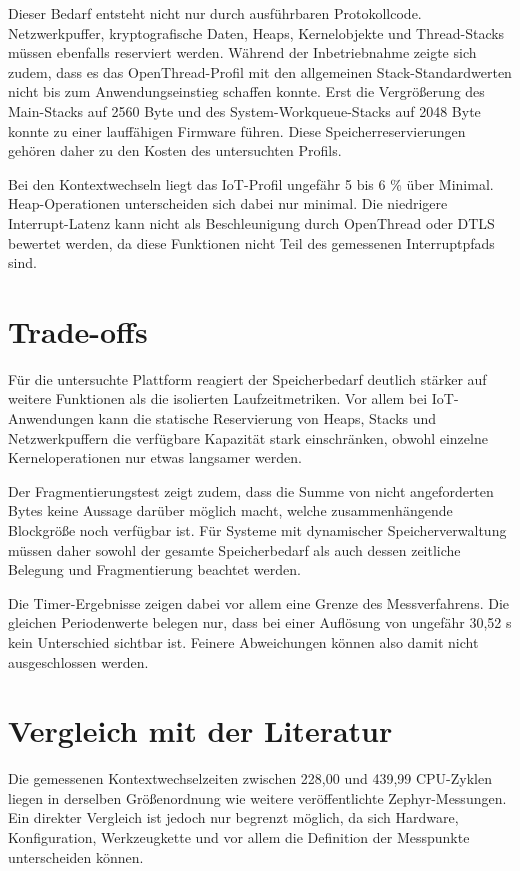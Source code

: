 Dieser Bedarf entsteht nicht nur durch ausf{\"u}hrbaren Protokollcode. Netzwerkpuffer, kryptografische Daten, Heaps, Kernelobjekte und Thread-Stacks m{\"u}ssen ebenfalls reserviert werden. W{\"a}hrend der Inbetriebnahme zeigte sich zudem, dass es das OpenThread-Profil mit den allgemeinen Stack-Standardwerten nicht bis zum Anwendungseinstieg schaffen konnte. Erst die Vergr{\"o}{\ss}erung des Main-Stacks auf 2560 Byte und des System-Workqueue-Stacks auf 2048 Byte konnte zu einer lauff{\"a}higen Firmware f{\"u}hren. Diese Speicherreservierungen geh{\"o}ren daher zu den Kosten des untersuchten Profils.

Bei den Kontextwechseln liegt das IoT-Profil ungef{\"a}hr 5 bis 6 \% {\"u}ber Minimal. Heap-Operationen unterscheiden sich dabei nur minimal. Die niedrigere Interrupt-Latenz kann nicht als Beschleunigung durch OpenThread oder DTLS bewertet werden, da diese Funktionen nicht Teil des gemessenen Interruptpfads sind.

\section{Trade-offs}
F{\"u}r die untersuchte Plattform reagiert der Speicherbedarf deutlich st{\"a}rker auf weitere Funktionen als die isolierten Laufzeitmetriken. Vor allem bei IoT-Anwendungen kann die statische Reservierung von Heaps, Stacks und Netzwerkpuffern die verf{\"u}gbare Kapazit{\"a}t stark einschr{\"a}nken, obwohl einzelne Kerneloperationen nur etwas langsamer werden.

Der Fragmentierungstest zeigt zudem, dass die Summe von nicht angeforderten Bytes keine Aussage dar{\"u}ber m{\"o}glich macht, welche zusammenh{\"a}ngende Blockgr{\"o}{\ss}e noch verf{\"u}gbar ist. F{\"u}r Systeme mit dynamischer Speicherverwaltung m{\"u}ssen daher sowohl der gesamte Speicherbedarf als auch dessen zeitliche Belegung und Fragmentierung beachtet werden.

Die Timer-Ergebnisse zeigen dabei vor allem eine Grenze des Messverfahrens. Die gleichen Periodenwerte belegen nur, dass bei einer Aufl{\"o}sung von ungef{\"a}hr 30,52 \textmu{}s kein Unterschied sichtbar ist. Feinere Abweichungen k{\"o}nnen also damit nicht ausgeschlossen werden.

\section{Vergleich mit der Literatur}
Die gemessenen Kontextwechselzeiten zwischen 228,00 und 439,99 CPU-Zyklen liegen in derselben Gr{\"o}{\ss}enordnung wie weitere ver{\"o}ffentlichte Zephyr-Messungen. Ein direkter Vergleich ist jedoch nur begrenzt m{\"o}glich, da sich Hardware, Konfiguration, Werkzeugkette und vor allem die Definition der Messpunkte unterscheiden k{\"o}nnen.

